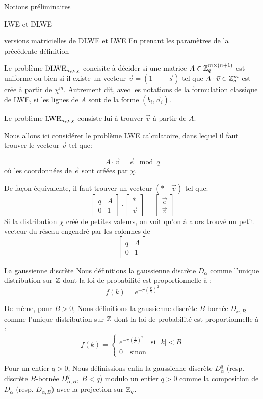 \begin{section}{Notions préliminaires}
\begin{subsection}{LWE et DLWE}
	\begin{definition}{versions matricielles de DLWE et LWE}
	En prenant les paramètres de la précédente définition

	Le problème $\text{DLWE}_{n,q,\chi}$ concisite à décider 
	si une matrice $A \in \mathbb{Z}_q^{m \times (n+1)}$ 
	est uniforme ou bien si il existe un vecteur $\vec{v} = (1\quad
	-\vec{s})$ tel que $A \cdot \vec{v} \in \mathbb{Z}_q^{m}$ est 
	crée à partir de $\chi^m$. Autrement dit, avec les notations de 
	la formulation classique de LWE, si les lignes de $A$ sont de la forme
		$(b_i, \vec{a}_i)$. 

	Le problème $\text{LWE}_{n,q,\chi}$ consiste lui à trouver $\vec{v}$ à partir de $A$.
	\end{definition}



	Nous allons ici considérer le problème LWE calculatoire, dans lequel il
	faut trouver le vecteur $\vec{v}$ tel que:

	\[ A\cdot \vec{v} = \vec{e} \mod q \]
	où les coordonnées de $\vec{e}$ sont créées par $\chi$.

	De façon équivalente, il faut trouver un vecteur $(*\quad\vec{v})$ tel
	que:
	\[ \begin{bmatrix}q & A \\ 0 &1 \end{bmatrix}\cdot
	   \begin{bmatrix}* \\ \vec{v} \end{bmatrix} =
	   \begin{bmatrix} \vec{e} \\ \vec{v} \end{bmatrix} \]
	Si la distribution $\chi$ créé de petites valeurs, on voit qu'on à
	alors trouvé un \og petit \fg vecteur du réseau engendré par les colonnes de 
	\[ \begin{bmatrix}q & A \\ 0 &1 \end{bmatrix} \]
	\end{subsection}
	\begin{subsection}{La gaussienne discrète}
	Nous définitions la gaussienne discrète
	$D_\alpha$ comme l'unique distribution sur $\mathbb{Z}$ dont la loi de probabilité 
	est proportionnelle à :
	\[ f(k) = e^{-\pi {\left(\frac{k}{\alpha}\right)}^2}\]

	De même, pour $B > 0$, 
	Nous définitions la gaussienne discrète $B$-bornée $D_{\alpha,B}$ comme l'unique distribution sur $\mathbb{Z}$ dont la loi de probabilité 
	est proportionnelle à :
	\[ f(k) = \begin{cases}e^{-\pi {\left(\frac{k}{\alpha}\right)}^2}
	\quad\text{si}\:\: |k| < B \\ 0 \quad \text{sinon}\end{cases}\]

	Pour un entier $q > 0$,  
	Nous définissions enfin la gaussienne discrète $D^q_{\alpha}$ (resp. discrète
	$B$-bornée $D^q_{\alpha,B},\: B < q$) modulo un entier $q > 0$ comme la
	composition de $D_\alpha$ 
	(resp. $D_{\alpha,B}$) avec la projection sur $\mathbb{Z}_q$.
	\end{subsection}
\end{section}
